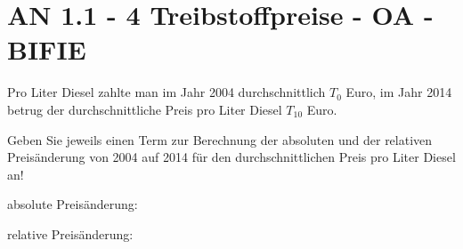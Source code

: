 \section{AN 1.1 - 4 Treibstoffpreise - OA - BIFIE}

\begin{beispiel}[AN 1.1]{1} %
Pro Liter Diesel zahlte man im Jahr 2004 durchschnittlich $T_0$ Euro, im Jahr 2014 betrug der durchschnittliche Preis pro Liter Diesel $T_{10}$ Euro. 

\leer

Geben Sie jeweils einen Term zur Berechnung der absoluten und der relativen Preisänderung von 2004 auf 2014 für den durchschnittlichen Preis pro Liter Diesel an! 

\leer

absolute Preisänderung:\,
\leer

relative Preisänderung:\,
\end{beispiel}